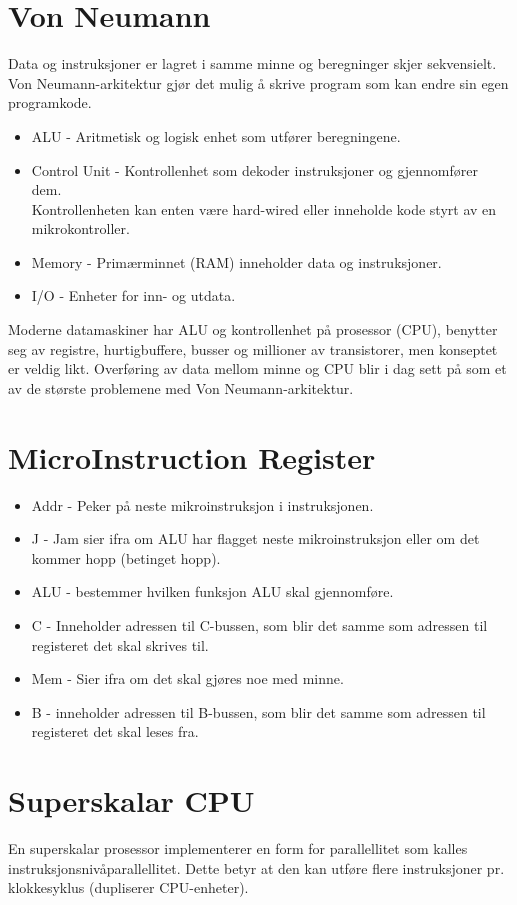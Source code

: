 \documentclass[a4paper, 10pt]{article}
\begin{document}
\section{Von Neumann}
Data og instruksjoner er lagret i samme minne og beregninger skjer sekvensielt. Von Neumann-arkitektur gjør det mulig å skrive program som kan endre sin egen programkode.

\begin{itemize}
	\item ALU - Aritmetisk og logisk enhet som utfører beregningene.
	\item Control Unit - Kontrollenhet som dekoder instruksjoner og gjennomfører dem. \\ Kontrollenheten kan enten være hard-wired eller inneholde kode styrt av en mikrokontroller.
	\item Memory - Primærminnet (RAM) inneholder data og instruksjoner.
	\item I/O - Enheter for inn- og utdata.
	
\end{itemize}

Moderne datamaskiner har ALU og kontrollenhet på prosessor (CPU), benytter seg av registre, hurtigbuffere, busser og millioner av transistorer, men konseptet er veldig likt. Overføring av data mellom minne og CPU blir i dag sett på som et av de største problemene med Von Neumann-arkitektur.

\section{MicroInstruction Register}
\begin{itemize}
	\item Addr - Peker på neste mikroinstruksjon i instruksjonen.
	\item J - Jam sier ifra om ALU har flagget neste mikroinstruksjon eller om det kommer hopp (betinget hopp).
	\item ALU - bestemmer hvilken funksjon ALU skal gjennomføre.
	\item C - Inneholder adressen til C-bussen, som blir det samme som adressen til registeret det skal skrives til. 
	\item Mem - Sier ifra om det skal gjøres noe med minne.
	\item B - inneholder adressen til B-bussen, som blir det samme som adressen til registeret det skal leses fra.
\end{itemize}

\section{Superskalar CPU}
En superskalar prosessor implementerer en form for parallellitet som kalles instruksjonsnivåparallellitet. Dette betyr at den kan utføre flere instruksjoner pr. klokkesyklus (dupliserer CPU-enheter).
\end{document}
